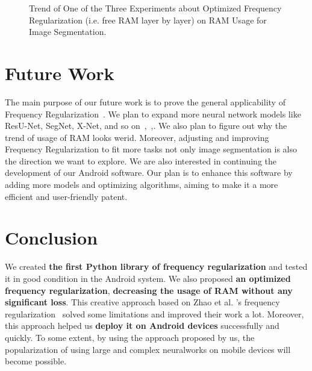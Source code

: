 \documentclass[runningheads]{llncs}
\begin{document}
\begin{figure}[h]
	\centering
	\caption{Trend of One of the Three Experiments about Optimized Frequency Regularization (i.e. free RAM layer by layer) on RAM Usage for Image Segmentation.}
	\label{plot:optimized}
\end{figure}


\section{Future Work}
The main purpose of our future work is to prove the general applicability of Frequency Regularization~\cite{zhao2023fr}. We plan to expand more neural network models like ResU-Net, SegNet, X-Net, and so on~\cite{foivos2020resunet},~\cite{vijay2017segnet},\cite{fujii2021xnet}. We also plan to figure out why the trend of usage of RAM looks werid. Moreover, adjusting and improving Frequency Regularization to fit more tasks not only image segmentation is also the direction we want to explore. We are also interested in continuing the development of our Android software. Our plan is to enhance this software by adding more models and optimizing algorithms, aiming to make it a more efficient and user-friendly patent.


\section{Conclusion} 
We created \textbf{the first Python library of frequency regularization} and tested it in good condition in the Android system. We also proposed \textbf{an optimized frequency regularization}, \textbf{decreasing the usage of RAM without any significant loss}. This creative approach based on Zhao et al. 's frequency regularization~\cite{zhao2023fr} solved some limitations and improved their work a lot. Moreover, this approach helped us \textbf{deploy it on Android devices} successfully and quickly. To some extent, by using the approach proposed by us, the popularization of using large and complex neuralworks on mobile devices will become possible.

\newpage


\end{document}
